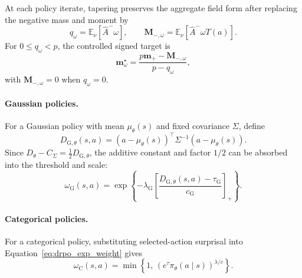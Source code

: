 \documentclass{article}
\theoremstyle{plain}
\theoremstyle{definition}
\theoremstyle{remark}
\begin{document}
At each policy iterate, tapering preserves the aggregate field form
after replacing the negative mass and moment by
\[
q_\omega=\mathbb E_\nu[\widehat A^-\omega],
\qquad
\mathbf M_{-,\omega}=\mathbb E_\nu[\widehat A^-\omega T(a)].
\]
For \(0\le q_\omega<p\), the controlled signed target is
\[
\mathbf m_\omega^\star
=
\frac{p\mathbf m_+-\mathbf M_{-,\omega}}{p-q_\omega},
\]
with \(\mathbf M_{-,\omega}=0\) when \(q_\omega=0\).

\paragraph{Gaussian policies.}
For a Gaussian policy with mean \(\mu_\theta(s)\) and fixed covariance
\(\Sigma\), define
\begin{equation}
    D_{\mathrm G,\theta}(s,a)
    =
    (a-\mu_\theta(s))^\top
    \Sigma^{-1}
    (a-\mu_\theta(s)).
    \label{eq:gaussian_squared_distance}
\end{equation}
Since \(D_\theta-C_\Sigma=\frac12D_{\mathrm G,\theta}\), the additive
constant and factor \(1/2\) can be absorbed into the threshold and scale:
\begin{equation}
    \omega_{\mathrm G}(s,a)
    =
    \exp
    \left\{
        -\lambda_{\mathrm G}
        \left[
            \frac{D_{\mathrm G,\theta}(s,a)-\tau_{\mathrm G}}
                 {c_{\mathrm G}}
        \right]_{+}
    \right\}.
    \label{eq:drpo_gaussian_weight}
\end{equation}

\paragraph{Categorical policies.}
For a categorical policy, substituting selected-action surprisal into
Equation~\eqref{eq:drpo_exp_weight} gives
\begin{equation}
    \omega_{\mathrm C}(s,a)
    =
    \min
    \left\{
        1,\,
        \left(e^{\tau}\pi_\theta(a\mid s)\right)^{\lambda/c}
    \right\}.
    \label{eq:drpo_categorical_weight}
\end{equation}
\end{document}
